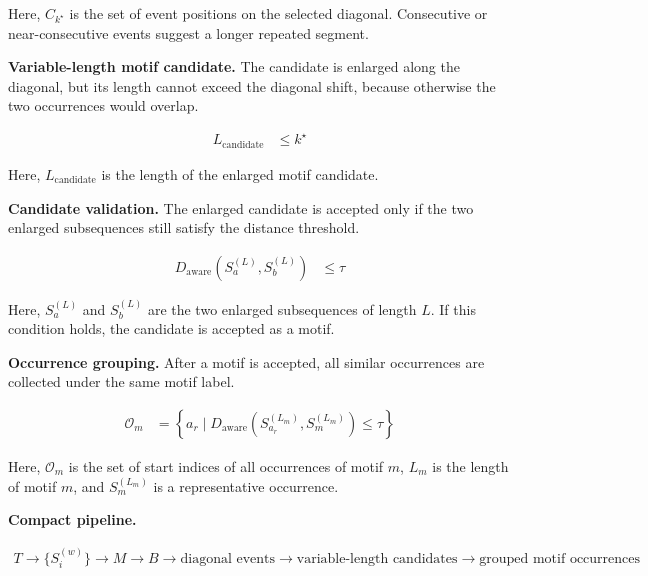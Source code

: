 \documentclass{book}
\begin{document}
      \noindent
      Here, \(C_{k^\star}\) is the set of event positions on the selected diagonal. Consecutive or near-consecutive events suggest a longer repeated segment.

      \noindent
      \textbf{Variable-length motif candidate.}
      The candidate is enlarged along the diagonal, but its length cannot exceed the diagonal shift, because otherwise the two occurrences would overlap.

      \begin{align}
         L_{\mathrm{candidate}}
         &\leq
         k^\star
      \end{align}

      \noindent
      Here, \(L_{\mathrm{candidate}}\) is the length of the enlarged motif candidate.

      \noindent
      \textbf{Candidate validation.}
      The enlarged candidate is accepted only if the two enlarged subsequences still satisfy the distance threshold.

      \begin{align}
         D_{\mathrm{aware}}(S_a^{(L)},S_b^{(L)})
         &\leq
         \ensuremath{\tau}
      \end{align}

      \noindent
      Here, \(S_a^{(L)}\) and \(S_b^{(L)}\) are the two enlarged subsequences of length \(L\). If this condition holds, the candidate is accepted as a motif.

      \noindent
      \textbf{Occurrence grouping.}
      After a motif is accepted, all similar occurrences are collected under the same motif label.

      \begin{align}
         \mathcal{O}_m
         &=
         \left\{
         a_r
         \mid
         D_{\mathrm{aware}}(S_{a_r}^{(L_m)},S_m^{(L_m)})\leq \ensuremath{\tau}
         \right\}
      \end{align}

      \noindent
      Here, \(\mathcal{O}_m\) is the set of start indices of all occurrences of motif \(m\), \(L_m\) is the length of motif \(m\), and \(S_m^{(L_m)}\) is a representative occurrence.

      \noindent
      \textbf{Compact pipeline.}

      \begin{align}
         T
         \rightarrow
         \{S_i^{(w)}\}
         \rightarrow
         M
         \rightarrow
         B
         \rightarrow
         \text{diagonal events}
         \rightarrow
         \text{variable-length candidates}
         \rightarrow
         \text{grouped motif occurrences}
      \end{align}
\end{document}

